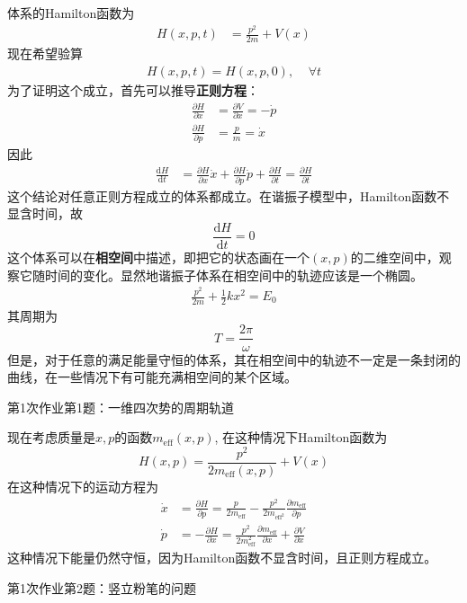     体系的Hamilton函数为
    \begin{align*}
        H(x,p,t) &= \frac {p^2}{2m} + V(x)
    \end{align*}
    现在希望验算
    \begin{align*}
        H(x,p,t) = H(x,p,0),~~~~~\forall t
    \end{align*}
    为了证明这个成立，首先可以推导\textbf{正则方程}：
    \begin{align*}
        \frac {\partial H}{\partial x} &= \frac {\partial V}{\partial x} = -\dot{p}\\
        \frac {\partial H}{\partial p} &= \frac pm = \dot{x}
    \end{align*}
    因此
    \begin{align*}
        \frac {\mathrm{d}H}{\mathrm{d}t} &= \frac {\partial H}{\partial x} \dot{x} + \frac {\partial H}{\partial p} \dot{p} + \frac {\partial H}{\partial t} = \frac {\partial H}{\partial t}
    \end{align*}
    这个结论对任意正则方程成立的体系都成立。在谐振子模型中，Hamilton函数不显含时间，故
    \begin{equation*}
        \frac {\mathrm{d}H}{\mathrm{d}t} = 0
    \end{equation*}
    这个体系可以在\textbf{相空间}中描述，即把它的状态画在一个$(x,p)$的二维空间中，观察它随时间的变化。显然地谐振子体系在相空间中的轨迹应该是一个椭圆。
    \begin{align*}
        \frac {p^2}{2m} + \frac 12 kx^2 = E_0
    \end{align*}
    其周期为
    \begin{equation*}
        T = \frac {2\pi}{\omega}
    \end{equation*}
    但是，对于任意的满足能量守恒的体系，其在相空间中的轨迹不一定是一条封闭的曲线，在一些情况下有可能充满相空间的某个区域。\cite{Landau2007mechanics}
    \begin{asg}
        第1次作业第1题：一维四次势的周期轨道
    \end{asg}

    现在考虑质量是$x,p$的函数$m_\mathrm{eff}(x,p)$, 在这种情况下Hamilton函数为
    \begin{equation*}
        H(x,p) = \frac {p^2}{2m_\mathrm{eff}(x,p)} + V(x)
    \end{equation*}
    在这种情况下的运动方程为
    \begin{align*}
        \dot{x} &= \frac {\partial H}{\partial p} = \frac {p}{2m_{\mathrm{eff}}} - \frac {p^2}{2m_{\mathrm{eff}^2}} \frac {\partial m_\mathrm{eff}}{\partial p} \\
        \dot{p} &= -\frac {\partial H}{\partial x} = \frac {p^2}{2m_\mathrm{eff}^2} \frac {\partial m_\mathrm{eff}}{\partial x} + \frac {\partial V}{\partial x}
    \end{align*}
    这种情况下能量仍然守恒，因为Hamilton函数不显含时间，且正则方程成立。
    \begin{asg}
        第1次作业第2题：竖立粉笔的问题
    \end{asg}
    
    
